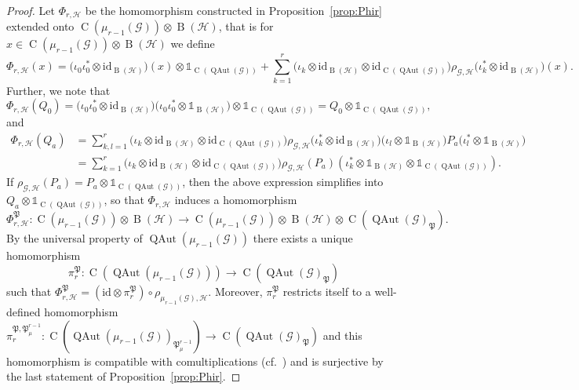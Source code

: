 \documentclass[11pt,reqno]{amsart}
\newcommand{\id}{\mathrm{id}}
\newcommand{\I}{\mathds{1}}
\newcommand{\comp}{\circ}
\newcommand{\tens}{\otimes}
\DeclareMathOperator{\QAut}{QAut}
\DeclareMathOperator{\B}{B}
\DeclareMathOperator{\C}{C}
\begin{document}
\begin{proof}
Let $\Phi_{r,\mathscr{H}}$ be the homomorphism constructed in Proposition~\ref{prop:Phir} extended onto $\C(\mu_{r-1}(\mathcal{G}))\tens\B(\mathscr{H})$, that is for $x\in\C(\mu_{r-1}(\mathcal{G}))\tens\B(\mathscr{H})$ we define
\[
\Phi_{r,\mathscr{H}}(x)=\bigl(\iota_0\iota_0^\ast\tens\id_{\B(\mathscr{H})}\bigr)(x)\tens\I_{\C(\QAut(\mathcal{G}))}+\sum\limits_{k=1}^r\bigl(\iota_k\tens\id_{\B(\mathscr{H})}\tens\id_{\C(\QAut(\mathcal{G}))}\bigr)\rho_{\mathcal{G},\mathscr{H}}\bigl(\iota_k^\ast\tens\id_{\B(\mathscr{H})}\bigr)(x).
\]
Further, we note that
\[
   \Phi_{r,\mathscr{H}}(Q_0)=\bigl(\iota_0\iota_0^\ast\tens\id_{\B(\mathscr{H})}\bigr)\bigl(\iota_0\iota_0^\ast\tens\I_{\B(\mathscr{H})}\bigr)\tens\I_{\C(\QAut(\mathcal{G}))}= Q_0\tens\I_{\C(\QAut(\mathcal{G}))},
\]
and
\[
\begin{aligned}
   \Phi_{r,\mathscr{H}}(Q_a)&=
   \sum\limits_{k,l=1}^r\bigl(\iota_k\tens\id_{\B(\mathscr{H})}\tens\id_{\C(\QAut(\mathcal{G}))}\bigr)\rho_{\mathcal{G},\mathscr{H}}\bigl(\iota_k^\ast\tens\id_{\B(\mathscr{H})}\bigr)\bigl(\iota_l\tens\I_{\B(\mathscr{H})}\bigr)P_a\bigl(\iota_l^\ast\tens\I_{\B(\mathscr{H})}\bigr)
   \\&=\sum\limits_{k=1}^r\bigl(\iota_k\tens\id_{\B(\mathscr{H})}\tens\id_{\C(\QAut(\mathcal{G}))}\bigr)\rho_{\mathcal{G},\mathscr{H}}(P_a) (\iota_k^\ast\tens\I_{\B(\mathscr{H})}\tens\I_{\C(\QAut(\mathcal{G}))}).
\end{aligned}
\]
If $\rho_{\scriptscriptstyle\mathcal{G},\mathscr{H}}(P_a)=P_a\tens\I_{\C(\QAut(\mathcal{G}))}$, then the above expression simplifies into $Q_a\tens\I_{\C(\QAut(\mathcal{G}))}$,
so that $\Phi_{r,\mathscr{H}}$ induces a homomorphism
\[
\Phi_{r,\mathscr{H}}^{\mathfrak{P}}\colon\C(\mu_{r-1}(\mathcal{G}))\tens\B(\mathscr{H})\longrightarrow\C(\mu_{r-1}(\mathcal{G}))\tens\B(\mathscr{H})\tens\C(\QAut(\mathcal{G})_{\mathfrak{P}}).
\]
By the universal property of $\QAut(\mu_{r-1}(\mathcal{G}))$ there exists a unique homomorphism\[\pi_r^{\mathfrak{P}}\colon\C(\QAut(\mu_{r-1}(\mathcal{G})))\longrightarrow\C(\QAut(\mathcal{G})_{\mathfrak{P}})\]such that $\Phi_{r,\mathscr{H}}^{\mathfrak{P}}=(\id\tens\pi_r^{\mathfrak{P}})\comp\rho_{\scriptscriptstyle\mu_{r-1}(\mathcal{G}),\mathscr{H}}$. Moreover, $\pi_r^{\mathfrak{P}}$ restricts itself to a well-defined homomorphism
$\pi_r^{\mathfrak{P},\mathfrak{P}_{\mu}^{r-1}}\colon\C(\QAut(\mu_{r-1}(\mathcal{G}))_{\mathfrak{P}_{\mu}^{r-1}})\to\C(\QAut(\mathcal{G})_{\mathfrak{P}})$ and this homomorphism is compatible with comultiplications (cf.~\cite[Proposition 4.7]{qFam}) and is surjective by the last statement of Proposition~\ref{prop:Phir}.
\end{proof}
\end{document}
